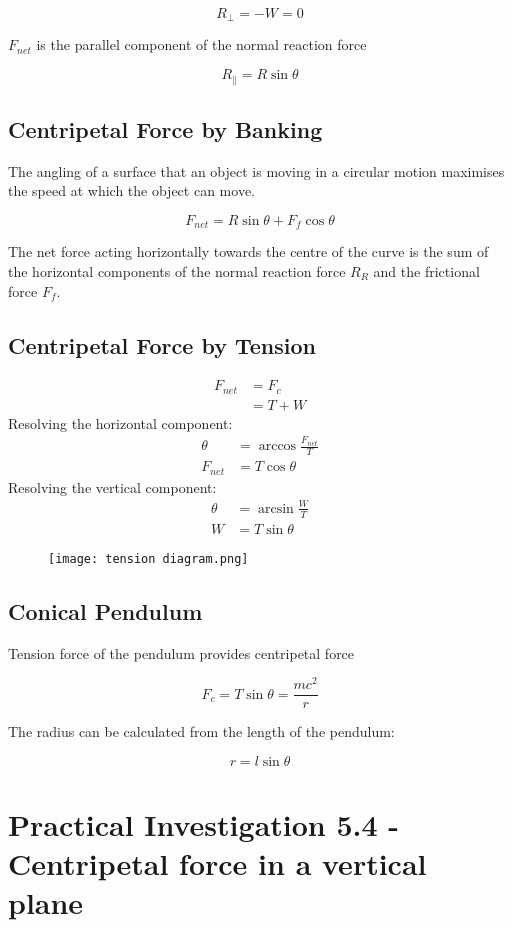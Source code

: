 		$$R_{\perp} = -W = 0$$

		$F_{net}$ is the parallel component of the normal reaction force

		$$R_{\parallel} = R \sin{\theta}$$
	
	\subsection{Centripetal Force by Banking}
		The angling of a surface that an object is moving in a circular motion maximises the speed at which the object can move.

		$$F_{net} = R\sin{\theta} + F_{f}\cos{\theta}$$

		The net force acting horizontally towards the centre of the curve is the sum of the horizontal components of the normal reaction force $R_R$ and the frictional force $F_f$.

	\subsection{Centripetal Force by Tension}
		\begin{align*}
			F_{net} &= F_c \\
			&= T + W
		\end{align*}
		Resolving the horizontal component:
		\begin{align*}
			\theta &= \arccos{\frac{F_{net}}{T}} \\
			F_{net} &= T\cos{\theta}
		\end{align*}
		Resolving the vertical component:
		\begin{align*}
			\theta &= \arcsin{\frac{W}{T}} \\
			W &= T\sin{\theta}
		\end{align*}
		\begin{figure}
			\centering
			\texttt{[image: tension diagram.png]}
		\end{figure}

	\subsection{Conical Pendulum}
		Tension force of the pendulum provides centripetal force

		$$F_c = T\sin{\theta} = \frac{mc^2}{r}$$

		The radius can be calculated from the length of the pendulum:

		$$r=l\sin{\theta}$$
		

\section{Practical Investigation 5.4 - Centripetal force in a vertical plane} \label{13/11/2024}
	
